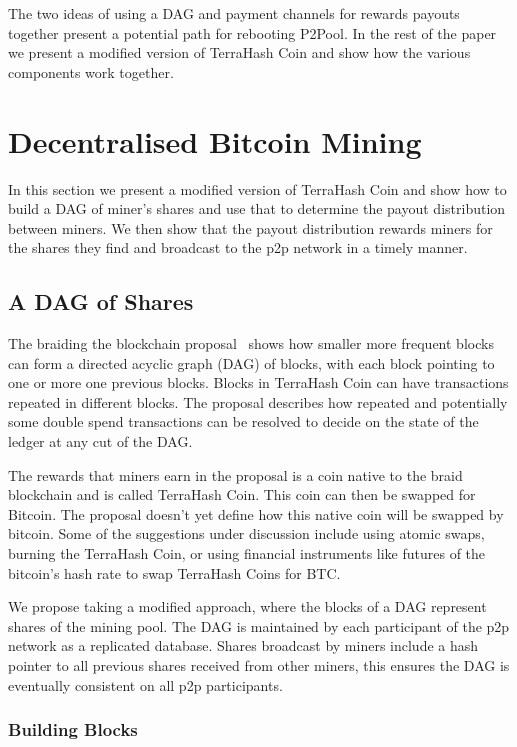 \documentclass{article}
\begin{document}
The two ideas of using a DAG and payment channels for rewards
payouts together present a potential path for rebooting P2Pool. In the
rest of the paper we present a modified version of TerraHash Coin and
show how the various components work together.

\section{Decentralised Bitcoin Mining}

In this section we present a modified version of TerraHash Coin and
show how to build a DAG of miner's shares and use that to determine
the payout distribution between miners. We then show that the payout
distribution rewards miners for the shares they find and broadcast to
the p2p network in a timely manner.

\subsection{A DAG of Shares}

The braiding the blockchain proposal~\cite{mcelrath:variance} shows
how smaller more frequent blocks can form a directed acyclic graph
(DAG) of blocks, with each block pointing to one or more one previous
blocks. Blocks in TerraHash Coin can have transactions repeated in
different blocks. The proposal describes how repeated and potentially
some double spend transactions can be resolved to decide on the state
of the ledger at any cut of the DAG.\@

The rewards that miners earn in the proposal is a coin native to the
braid blockchain and is called TerraHash Coin. This coin can then be
swapped for Bitcoin. The proposal doesn't yet define how this native
coin will be swapped by bitcoin. Some of the suggestions under
discussion include using atomic swaps, burning the TerraHash Coin, or
using financial instruments like futures of the bitcoin's hash rate to
swap TerraHash Coins for BTC.\@

We propose taking a modified approach, where the blocks of a DAG
represent shares of the mining pool. The DAG is maintained by each
participant of the p2p network as a replicated database. Shares
broadcast by miners include a hash pointer to all previous shares
received from other miners, this ensures the DAG is eventually
consistent on all p2p participants.

\subsubsection{Building Blocks}\label{sec:building-blocks}
\end{document}
